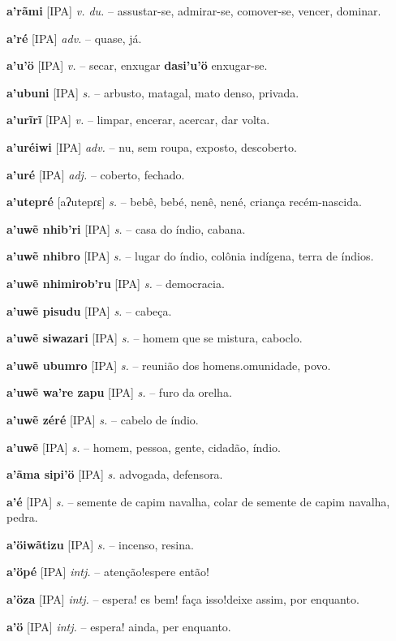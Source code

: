 \textbf{a'rãmi} [IPA] \textit{v. du.} -- assustar-se, admirar-se, comover-se, vencer, dominar.

\textbf{a'ré} [IPA] \textit{adv.} -- quase, já.

\textbf{a'u'ö} [IPA] \textit{v.} -- secar, enxugar  \textbf{dasi'u'ö} enxugar-se.

\textbf{a'ubuni} [IPA] \textit{s.} -- arbusto, matagal, mato denso, privada.

\textbf{a'urĩrĩ} [IPA] \textit{v.} -- limpar, encerar, acercar, dar volta.

\textbf{a'uréiwi} [IPA] \textit{adv.} -- nu, sem roupa, exposto, descoberto.

\textbf{a'uré} [IPA] \textit{adj.} -- coberto, fechado.

\textbf{a'utepré} [aʔutepɾɛ] \textit{s.} -- bebê, bebé, nenê, nené, criança recém-nascida.

\textbf{a'uwẽ nhib'ri} [IPA] \textit{s.} -- casa do índio, cabana.

\textbf{a'uwẽ nhibro} [IPA] \textit{s.} -- lugar do índio, colônia indígena, terra de índios.

\textbf{a'uwẽ nhimirob'ru} [IPA] \textit{s.} -- democracia.

\textbf{a'uwẽ pisudu} [IPA] \textit{s.} -- cabeça.

\textbf{a'uwẽ siwazari} [IPA] \textit{s.} -- homem que se mistura, caboclo.

\textbf{a'uwẽ ubumro} [IPA] \textit{s.} -- reunião dos homens.omunidade, povo.

\textbf{a'uwẽ wa're zapu} [IPA] \textit{s.} -- furo da orelha.

\textbf{a'uwẽ zéré} [IPA] \textit{s.} -- cabelo de índio.

\textbf{a'uwẽ} [IPA] \textit{s.} -- homem, pessoa, gente, cidadão, índio.

\textbf{a'ãma sipi'ö} [IPA] \textit{s.} advogada, defensora.

\textbf{a'é} [IPA] \textit{s.} -- semente de capim navalha, colar de semente de capim navalha, pedra.

\textbf{a'öiwãtizu} [IPA] \textit{s.} -- incenso, resina.

\textbf{a'öpé} [IPA] \textit{intj.} -- atenção!espere então!

\textbf{a'öza} [IPA] \textit{intj.} -- espera! es bem! faça isso!deixe assim, por enquanto.

\textbf{a'ö} [IPA] \textit{intj.} -- espera! ainda, per enquanto.

